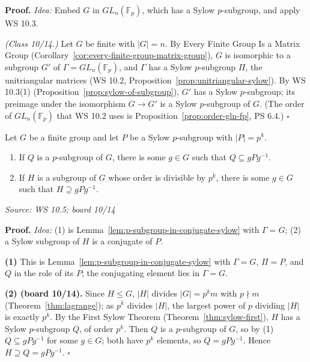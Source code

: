 \documentclass[11pt]{report}
\renewenvironment{proof}[1][Proof]{\noindent\textbf{#1.} }{\hfill$\square$\par\vspace{5pt}}
\newcommand{\srcline}[1]{\par\hfill{\footnotesize\textit{Source: #1}}}
\begin{document}
\begin{proof}
\textit{Idea:} Embed $G$ in $GL_n(\mathbb{F}_p)$, which has a Sylow $p$-subgroup, and apply WS 10.3.\par
\textit{(Class 10/14.)} Let $G$ be finite with $|G| = n$. By Every Finite Group Is a Matrix Group (Corollary~\ref{cor:every-finite-group-matrix-group}), $G$ is isomorphic to a subgroup $G'$ of $\Gamma = GL_n(\mathbb{F}_p)$, and $\Gamma$ has a Sylow $p$-subgroup $\Pi$, the unitriangular matrices (WS 10.2, Proposition~\ref{prop:unitriangular-sylow}). By WS 10.3(1) (Proposition~\ref{prop:sylow-of-subgroup}), $G'$ has a Sylow $p$-subgroup; its preimage under the isomorphism $G \to G'$ is a Sylow $p$-subgroup of $G$. (The order of $GL_n(\mathbb{F}_p)$ that WS 10.2 uses is Proposition~\ref{prop:order-gln-fp}, PS 6.4.)
\end{proof}

\begin{propbox}\label{prop:p-subgroups-conjugates-sylow}
Let $G$ be a finite group and let $P$ be a Sylow $p$-subgroup with $|P| = p^k$.
\begin{enumerate}
    \item If $Q$ is a $p$-subgroup of $G$, there is some $g \in G$ such that $Q \subseteq gPg^{-1}$.
    \item If $H$ is a subgroup of $G$ whose order is divisible by $p^k$, there is some $g \in G$ such that $H \supseteq gPg^{-1}$.
\end{enumerate}
\srcline{WS 10.5; board 10/14}
\end{propbox}

\begin{proof}
\textit{Idea:} (1) is Lemma~\ref{lem:p-subgroup-in-conjugate-sylow} with $\Gamma = G$; (2) a Sylow subgroup of $H$ is a conjugate of $P$.\par
\textbf{(1)} This is Lemma~\ref{lem:p-subgroup-in-conjugate-sylow} with $\Gamma = G$, $\Pi = P$, and $Q$ in the role of its $P$; the conjugating element lies in $\Gamma = G$.

\textbf{(2) (board 10/14).} Since $H \leq G$, $|H|$ divides $|G| = p^k m$ with $p \nmid m$ (Theorem~\ref{thm:lagrange}); as $p^k$ divides $|H|$, the largest power of $p$ dividing $|H|$ is exactly $p^k$. By the First Sylow Theorem (Theorem~\ref{thm:sylow-first}), $H$ has a Sylow $p$-subgroup $Q$, of order $p^k$. Then $Q$ is a $p$-subgroup of $G$, so by (1) $Q \subseteq gPg^{-1}$ for some $g \in G$; both have $p^k$ elements, so $Q = gPg^{-1}$. Hence $H \supseteq Q = gPg^{-1}$.
\end{proof}
\end{document}
